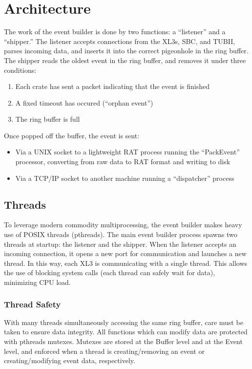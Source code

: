 \documentclass[11pt,twocolumn]{article}
\begin{document}
\section{Architecture}
The work of the event builder is done by two functions: a ``listener'' and a ``shipper.'' The listener accepts connections from the XL3s, SBC, and TUBII, parses incoming data, and inserts it into the correct pigeonhole in the ring buffer. The shipper reads the oldest event in the ring buffer, and removes it under three conditions:
\begin{enumerate}
\item Each crate has sent a packet indicating that the event is finished
\item A fixed timeout has occured (``orphan event'')
\item The ring buffer is full
\end{enumerate}
Once popped off the buffer, the event is sent:
\begin{itemize}
\item Via a UNIX socket to a lightweight RAT process running the ``PackEvent'' processor, converting from raw data to RAT format and writing to disk
\item Via a TCP/IP socket to another machine running a ``dispatcher'' process
\end{itemize}

\subsection{Threads}
To leverage modern commodity multiprocessing, the event builder makes heavy use of POSIX threads (pthreads). The main event builder process spawns two threads at startup: the listener and the shipper. When the listener accepts an incoming connection, it opens a new port for communication and launches a new thread. In this way, each XL3 is communicating with a single thread. This allows the use of blocking system calls (each thread can safely wait for data), minimizing CPU load.

\subsubsection{Thread Safety}
With many threads simultaneously accessing the same ring buffer, care must be taken to ensure data integrity. All functions which can modify data are protected with pthreads mutexes. Mutexes are stored at the Buffer level and at the Event level, and enforced when a thread is creating/removing an event or creating/modifying event data, respectively.
\end{document}
